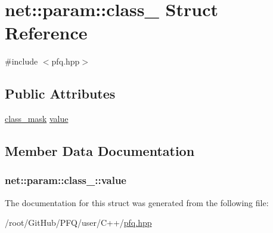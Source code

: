 \hypertarget{structnet_1_1param_1_1class__}{\section{net\-:\-:param\-:\-:class\-\_\- Struct Reference}
\label{structnet_1_1param_1_1class__}
}


{\ttfamily \#include $<$pfq.\-hpp$>$}

\subsection*{Public Attributes}
\begin{DoxyCompactItemize}
\item 
\hyperlink{namespacenet_a1dbd93552dc6ef6fbb0bb79d43ca22fd}{class\-\_\-mask} \hyperlink{structnet_1_1param_1_1class___a0662bf5d26b377299339f531f293fa9b}{value}
\end{DoxyCompactItemize}


\subsection{Member Data Documentation}
\hypertarget{structnet_1_1param_1_1class___a0662bf5d26b377299339f531f293fa9b}{
\subsubsection[{value}]{ net\-::param\-::class\-\_\-\-::value}}\label{structnet_1_1param_1_1class___a0662bf5d26b377299339f531f293fa9b}


The documentation for this struct was generated from the following file\-:\begin{DoxyCompactItemize}
\item 
/root/\-Git\-Hub/\-P\-F\-Q/user/\-C++/\hyperlink{pfq_8hpp}{pfq.\-hpp}\end{DoxyCompactItemize}
